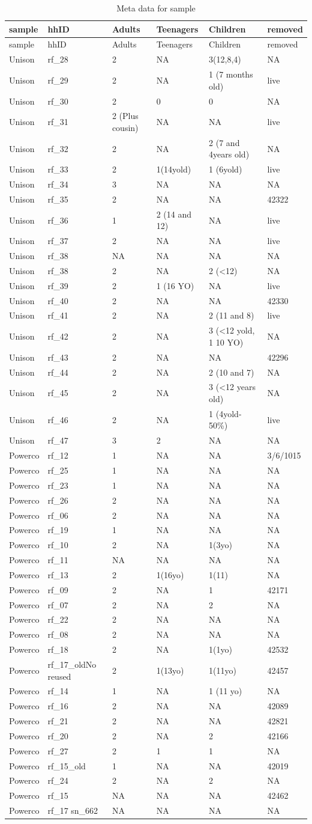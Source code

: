 \documentclass[]{article}
\begin{document}
\begin{longtable}[]{@{}llllll@{}}
\caption{Meta data for sample}\tabularnewline
\toprule
sample & hhID & Adults & Teenagers & Children & removed\tabularnewline
\midrule
\endfirsthead
\toprule
sample & hhID & Adults & Teenagers & Children & removed\tabularnewline
\midrule
\endhead
Unison & rf\_28 & 2 & NA & 3(12,8,4) & NA\tabularnewline
Unison & rf\_29 & 2 & NA & 1 (7 months old) & live\tabularnewline
Unison & rf\_30 & 2 & 0 & 0 & NA\tabularnewline
Unison & rf\_31 & 2 (Plus cousin) & NA & NA & live\tabularnewline
Unison & rf\_32 & 2 & NA & 2 (7 and 4years old) & NA\tabularnewline
Unison & rf\_33 & 2 & 1(14yold) & 1 (6yold) & live\tabularnewline
Unison & rf\_34 & 3 & NA & NA & NA\tabularnewline
Unison & rf\_35 & 2 & NA & NA & 42322\tabularnewline
Unison & rf\_36 & 1 & 2 (14 and 12) & NA & live\tabularnewline
Unison & rf\_37 & 2 & NA & NA & live\tabularnewline
Unison & rf\_38 & NA & NA & NA & NA\tabularnewline
Unison & rf\_38 & 2 & NA & 2 (\textless{}12) & NA\tabularnewline
Unison & rf\_39 & 2 & 1 (16 YO) & NA & live\tabularnewline
Unison & rf\_40 & 2 & NA & NA & 42330\tabularnewline
Unison & rf\_41 & 2 & NA & 2 (11 and 8) & live\tabularnewline
Unison & rf\_42 & 2 & NA & 3 (\textless{}12 yold, 1 10 YO) &
NA\tabularnewline
Unison & rf\_43 & 2 & NA & NA & 42296\tabularnewline
Unison & rf\_44 & 2 & NA & 2 (10 and 7) & NA\tabularnewline
Unison & rf\_45 & 2 & NA & 3 (\textless{}12 years old) &
NA\tabularnewline
Unison & rf\_46 & 2 & NA & 1 (4yold-50\%) & live\tabularnewline
Unison & rf\_47 & 3 & 2 & NA & NA\tabularnewline
Powerco & rf\_12 & 1 & NA & NA & 3/6/1015\tabularnewline
Powerco & rf\_25 & 1 & NA & NA & NA\tabularnewline
Powerco & rf\_23 & 1 & NA & NA & NA\tabularnewline
Powerco & rf\_26 & 2 & NA & NA & NA\tabularnewline
Powerco & rf\_06 & 2 & NA & NA & NA\tabularnewline
Powerco & rf\_19 & 1 & NA & NA & NA\tabularnewline
Powerco & rf\_10 & 2 & NA & 1(3yo) & NA\tabularnewline
Powerco & rf\_11 & NA & NA & NA & NA\tabularnewline
Powerco & rf\_13 & 2 & 1(16yo) & 1(11) & NA\tabularnewline
Powerco & rf\_09 & 2 & NA & 1 & 42171\tabularnewline
Powerco & rf\_07 & 2 & NA & 2 & NA\tabularnewline
Powerco & rf\_22 & 2 & NA & NA & NA\tabularnewline
Powerco & rf\_08 & 2 & NA & NA & NA\tabularnewline
Powerco & rf\_18 & 2 & NA & 1(1yo) & 42532\tabularnewline
Powerco & rf\_17\_oldNo reused & 2 & 1(13yo) & 1(11yo) &
42457\tabularnewline
Powerco & rf\_14 & 1 & NA & 1 (11 yo) & NA\tabularnewline
Powerco & rf\_16 & 2 & NA & NA & 42089\tabularnewline
Powerco & rf\_21 & 2 & NA & NA & 42821\tabularnewline
Powerco & rf\_20 & 2 & NA & 2 & 42166\tabularnewline
Powerco & rf\_27 & 2 & 1 & 1 & NA\tabularnewline
Powerco & rf\_15\_old & 1 & NA & NA & 42019\tabularnewline
Powerco & rf\_24 & 2 & NA & 2 & NA\tabularnewline
Powerco & rf\_15 & NA & NA & NA & 42462\tabularnewline
Powerco & rf\_17 sn\_662 & NA & NA & NA & NA\tabularnewline
\bottomrule
\end{longtable}
\end{document}
